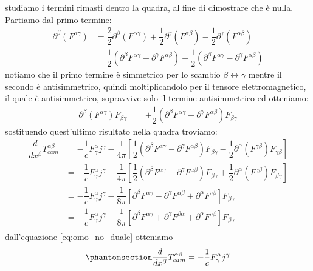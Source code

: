 studiamo i termini rimasti dentro la quadra, al fine di dimostrare che è nulla. Partiamo dal primo termine:
\begin{equation}
\begin{aligned}
\partial^\beta(F^{\alpha\gamma})&=\dfrac{2}{2}\partial^\beta(F^{\alpha\gamma})+\dfrac{1}{2}\partial^\gamma(F^{\alpha\beta})-\dfrac{1}{2}\partial^\gamma(F^{\alpha\beta})\\
&=\dfrac{1}{2}(\partial^\beta F^{\alpha\gamma}+\partial^\gamma F^{\alpha\beta})+\dfrac{1}{2}(\partial^\beta F^{\alpha\gamma}-\partial^\gamma F^{\alpha\beta})
\end{aligned}
\end{equation}
notiamo che il primo termine è simmetrico per lo scambio $\beta\leftrightarrow\gamma$ mentre il secondo è antisimmetrico, quindi moltiplicandolo per il tensore elettromagnetico, il quale è antisimmetrico, sopravvive solo il termine antisimmetrico ed otteniamo:
\begin{equation}
\begin{aligned}
\partial^\beta(F^{\alpha\gamma})F_{\beta\gamma}&=+\dfrac{1}{2}(\partial^\beta F^{\alpha\gamma}-\partial^\gamma F^{\alpha\beta})F_{\beta\gamma}
\end{aligned}
\end{equation}
sostituendo quest'ultimo risultato nella quadra troviamo:
\begin{equation}
\begin{aligned}
\dfrac{d}{dx^\beta}T^{\alpha\beta}_{cam}&=-\dfrac{1}{c}F^\alpha_\gamma j^\gamma-\dfrac{1}{4\pi}\left[\dfrac{1}{2}(\partial^\beta F^{\alpha\gamma}-\partial^\gamma F^{\alpha\beta})F_{\beta\gamma}-\dfrac{1}{2}\partial^\alpha(F^{\gamma\beta}) F_{\gamma\beta}   \right]\\
&=-\dfrac{1}{c}F^\alpha_\gamma j^\gamma-\dfrac{1}{4\pi}\left[\dfrac{1}{2}(\partial^\beta F^{\alpha\gamma}-\partial^\gamma F^{\alpha\beta})F_{\beta\gamma}+\dfrac{1}{2}\partial^\alpha(F^{\gamma\beta}) F_{\beta\gamma}   \right]\\
&=-\dfrac{1}{c}F^\alpha_\gamma j^\gamma-\dfrac{1}{8\pi}\left[\partial^\beta F^{\alpha\gamma}-\partial^\gamma F^{\alpha\beta} +\partial^\alpha F^{\gamma\beta}   \right]F_{\beta\gamma}\\
&=-\dfrac{1}{c}F^\alpha_\gamma j^\gamma-\dfrac{1}{8\pi}\left[\partial^\beta F^{\alpha\gamma}+\partial^\gamma F^{\beta\alpha} +\partial^\alpha F^{\gamma\beta}   \right]F_{\beta\gamma}\\
\end{aligned}
\end{equation}
dall'equazione \eqref{eq:omo_no_duale} otteniamo
\begin{equation}\phantomsection\label{eq:tens_camp}
\dfrac{d}{dx^\beta}T^{\alpha\beta}_{cam}=-\dfrac{1}{c}F^\alpha_\gamma j^\gamma
\end{equation}

